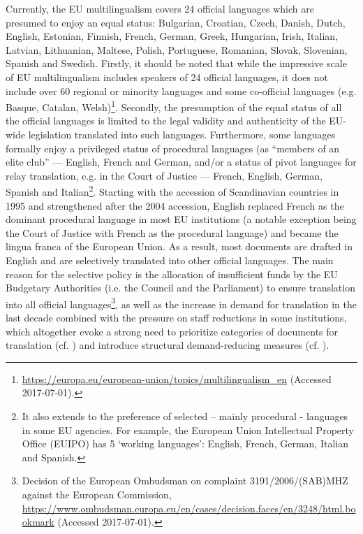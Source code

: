 \documentclass[output=paper]{langsci/langscibook}
\begin{document}
Currently, the EU multilingualism covers 24 official languages which are presumed to enjoy an equal status: Bulgarian, Croatian, Czech, Danish, Dutch, English, Estonian, Finnish, French, German, Greek, Hungarian, Irish, Italian, Latvian, Lithuanian, Maltese, Polish, Portuguese, Romanian, Slovak, Slovenian, Spanish and Swedish. Firstly, it should be noted that while the impressive scale of EU multilingualism includes speakers of 24 official languages, it does not include over 60 regional or minority languages and some co-official languages (e.g. Basque, Catalan, Welsh)\footnote{\url{https://europa.eu/european-union/topics/multilingualism_en} (Accessed 2017-07-01).}. Secondly, the presumption of the equal status of all the official languages is limited to the legal validity and authenticity of the EU-wide legislation translated into such languages. Furthermore, some languages formally enjoy a privileged status of procedural languages (as “members of an elite club” \citep[560]{Craith2006} — English, French and German, and/or a status of pivot languages for relay translation, e.g. in the Court of Justice — French, English, German, Spanish and Italian\footnote{It also extends to the preference of selected – mainly procedural - languages in some EU agencies. For example, the European Union Intellectual Property Office (EUIPO) has 5 ‘working languages’: English, French, German, Italian and Spanish.}. Starting with the accession of Scandinavian countries in 1995 and strengthened after the 2004 accession, English replaced French as the dominant procedural language in most EU institutions (a notable exception being the Court of Justice with French as the procedural language) and became the lingua franca of the European Union. As a result, most documents are drafted in English and are selectively translated into other official languages. The main reason for the selective policy is the allocation of insufficient funds by the EU Budgetary Authorities (i.e. the Council and the Parliament) to ensure translation into all official languages\footnote{Decision of the European Ombudsman on complaint 3191/2006/(SAB)MHZ against the European Commission, \url{https://www.ombudsman.europa.eu/en/cases/decision.faces/en/3248/html.bookmark} (Accessed 2017-07-01).}, as well as the increase in demand for translation in the last decade combined with the pressure on staff reductions in some institutions, which altogether evoke a strong need to prioritize categories of documents for translation (cf. \citeauthor[4]{DGT2016b}) and introduce structural demand-reducing measures (cf. \citealt{Strandvik2017forthcoming}).
\end{document}
